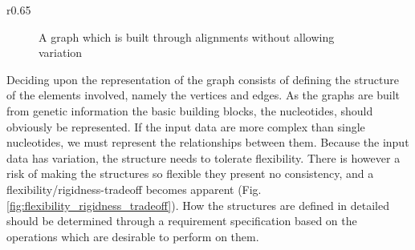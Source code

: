 \documentclass[thesis.tex]{subfiles}
\begin{document}
\begin{wrapfigure}{r}{0.65\textwidth}
\begin{mdframed}
\begin{subfigure}[t]{\textwidth}
\begin{mdframed}
\begin{center}
        \end{center}
      \end{mdframed}
      \caption{A graph which is built through alignments without allowing variation}
    \end{subfigure}
  \end{mdframed}
  \caption{Two propsed graph models displaying flexibility (a) and rigidity (b)}
  \label{fig:flexibility_rigidness_tradeoff}
\end{wrapfigure}
Deciding upon the representation of the graph consists of defining the structure of the elements involved, namely the vertices and edges. As the graphs are built from genetic information the basic building blocks, the nucleotides, should obviously be represented. If the input data are more complex than single nucleotides, we must represent the relationships between them. Because the input data has variation, the structure needs to tolerate flexibility. There is however a risk of making the structures so flexible they present no consistency, and a flexibility/rigidness-tradeoff becomes apparent (Fig. \ref{fig:flexibility_rigidness_tradeoff}). How the structures are defined in detailed should be determined through a requirement specification based on the operations which are desirable to perform on them.
\end{document}
